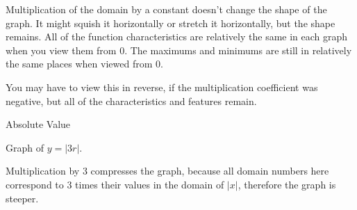 \documentclass{ximera}
\begin{document}
Multiplication of the domain by a constant doesn't change the shape of the graph.  It might squish it horizontally or stretch it horizontally, but the shape remains.  All of the function characteristics are relatively the same in each graph when you view them from $0$. The maximums and minimums are still in relatively the same places when viewed from $0$.  

You may have to view this in reverse, if the multiplication coefficient was negative, but all of the characteristics and features remain.








\begin{example} Absolute Value



Graph of $y = |3r|$.



\begin{image}
\end{image}



Multiplication by $3$ compresses the graph, because all domain numbers here correspond to $3$ times their values in the domain of $|x|$, therefore the graph is steeper.






\end{example}
\end{document}
